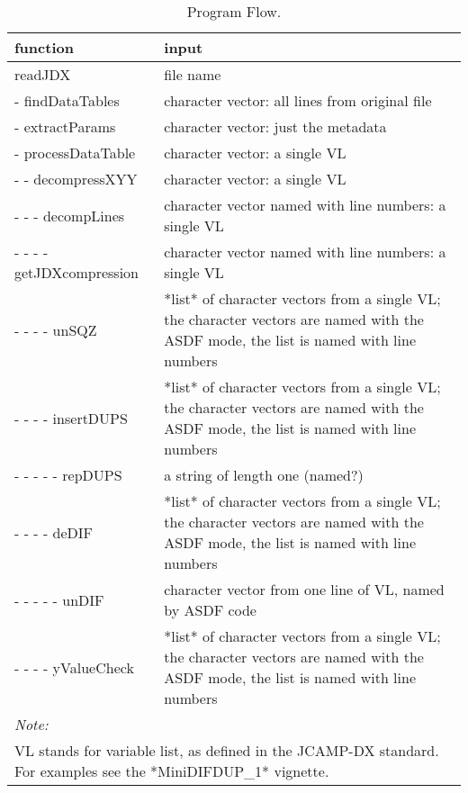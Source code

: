 \documentclass[10pt,twoside,]{pinp}
\begin{document}
\begin{table}[!h]

\caption{\label{tab:progFlow}Program Flow.\label{tab:PF}}
\centering
\begin{tabular}{ll}
\toprule
function & input\\
\midrule
\rowcolor{gray!6}  readJDX & file name\\
- findDataTables & character vector: all lines from original file\\
\rowcolor{gray!6}  - extractParams & character vector: just the metadata\\
- processDataTable & character vector: a single VL\\
\rowcolor{gray!6}  - - decompressXYY & character vector: a single VL\\
\addlinespace
- - - decompLines & character vector named with line numbers: a single VL\\
\rowcolor{gray!6}  - - - - getJDXcompression & character vector named with line numbers: a single VL\\
- - - - unSQZ & *list* of character vectors from a single VL; the character vectors are named with the ASDF mode, the list is named with line numbers\\
\rowcolor{gray!6}  - - - - insertDUPS & *list* of character vectors from a single VL; the character vectors are named with the ASDF mode, the list is named with line numbers\\
- - - - - repDUPS & a string of length one (named?)\\
\addlinespace
\rowcolor{gray!6}  - - - - deDIF & *list* of character vectors from a single VL; the character vectors are named with the ASDF mode, the list is named with line numbers\\
- - - - - unDIF & character vector from one line of VL, named by ASDF code\\
\rowcolor{gray!6}  - - - - yValueCheck & *list* of character vectors from a single VL; the character vectors are named with the ASDF mode, the list is named with line numbers\\
\bottomrule
\multicolumn{2}{l}{\textit{Note: }}\\
\multicolumn{2}{l}{VL stands for variable list, as defined in the JCAMP-DX standard. For examples see the *MiniDIFDUP\_1* vignette.}\\
\end{tabular}
\end{table}


\pnasbreak 
\end{document}
